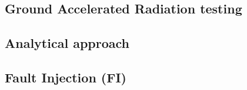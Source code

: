 {{{		}
		\subsection{Ground Accelerated Radiation testing}{
			
		}
		\subsection{Analytical approach}{
			
		}
		\subsection{Fault Injection (FI)}{
			
		}
	}
}